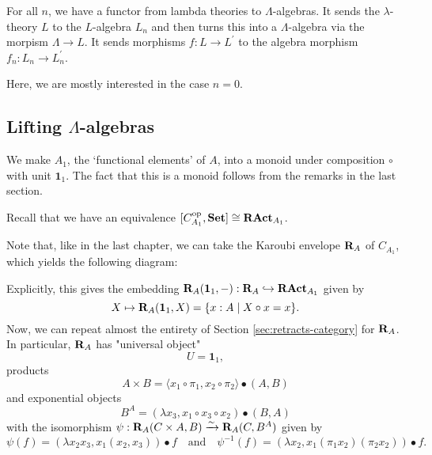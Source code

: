 \begin{definition}
  For all $ n $, we have a functor from lambda theories to $ \Lambda $-algebras. It sends the $ \lambda $-theory $ L $ to the $ L $-algebra $ L_n $ and then turns this into a $ \Lambda $-algebra via the morpism $ \Lambda \to L $. It sends morphisms $ f: L \to L^\prime $ to the algebra morphism $ f_n : L_n \to L^\prime_n $.
\end{definition}

Here, we are mostly interested in the case $ n = 0 $.

\subsection{Lifting \texorpdfstring{$ \Lambda $}{Lambda}-algebras}

\begin{definition}
  We make $ A_1 $, the `functional elements' of $ A $, into a monoid under composition $ \circ $ with unit $ \mathbf 1_1 $. The fact that this is a monoid follows from the remarks in the last section.
\end{definition}

Recall that we have an equivalence $ [C_{A_1}^{\text{op}}, \mathbf{Set}] \cong \mathbf{RAct}_{A_1} $.

\begin{remark}
  Note that, like in the last chapter, we can take the Karoubi envelope $ \mathbf{R}_A $ of $ C_{A_1} $, which yields the following diagram:
  \begin{center}
  \end{center}
  Explicitly, this gives the embedding $ \mathbf{R}_A(\mathbf 1_1, -): \mathbf{R}_A \hookrightarrow \mathbf{RAct}_{A_1} $ given by
  \[ X \mapsto \mathbf{R}_A(\mathbf 1_1, X) = \{ x : A \mid X \circ x = x \}. \]
  Now, we can repeat almost the entirety of Section \ref{sec:retracts-category} for $ \mathbf{R}_A $. In particular, $ \mathbf{R}_A $ has "universal object"
  \[ U = \mathbf 1_1, \]
  products
  \[ A \times B = \langle x_1 \circ \pi_1, x_2 \circ \pi_2 \rangle \bullet (A, B) \]
  and exponential objects
  \[ B^A = (\lambda x_3, x_1 \circ x_3 \circ x_2) \bullet (B, A) \]
  with the isomorphism $ \psi: \mathbf{R}_A(C \times A, B) \xrightarrow \sim \mathbf{R}_A(C, B^A) $
  given by
  \[ \psi(f) = (\lambda x_2 x_3, x_1 (x_2, x_3)) \bullet f \quad \text{and} \quad \psi^{-1}(f) = (\lambda x_2, x_1 (\pi_1 x_2) (\pi_2 x_2)) \bullet f. \]
\end{remark}

